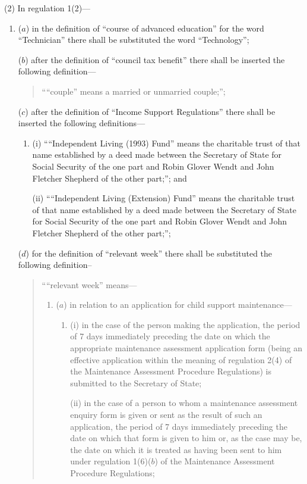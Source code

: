 \documentclass[a4paper]{article}
\begin{document}
(2) In regulation 1(2)---
\begin{enumerate}\item[]
($a$) in the definition of “course of advanced education” for the word “Technician” there shall be substituted the word “Technology”;

($b$) after the definition of “council tax benefit” there shall be inserted the following definition---
\begin{quotation}
““couple” means a married or unmarried couple;”;
\end{quotation}

($c$) after the definition of “Income Support Regulations” there shall be inserted the following definitions---
\begin{enumerate}\item[]
(i) ““Independent Living (1993) Fund” means the charitable trust of that name established by a deed made between the Secretary of State for Social Security of the one part and Robin Glover Wendt and John Fletcher Shepherd of the other part;”; and

(ii) ““Independent Living (Extension) Fund” means the charitable trust of that name established by a deed made between the Secretary of State for Social Security of the one part and Robin Glover Wendt and John Fletcher Shepherd of the other part;”;
\end{enumerate}

($d$) for the definition of “relevant week” there shall be substituted the following definition–
\begin{quotation}
““relevant week” means---
\begin{enumerate}\item[]
($a$) in relation to an application for child support maintenance\hspace{0pt}---
\begin{enumerate}\item[]
(i) in the case of the person making the application, the period of 7 days immediately preceding the date on which the appropriate maintenance assessment application form (being an effective application within the meaning of regulation 2(4) of the Maintenance Assessment Procedure Regulations) is submitted to the Secretary of State;

(ii) in the case of a person to whom a maintenance assessment enquiry form is given or sent as the result of such an application, the period of 7 days immediately preceding the date on which that form is given to him or, as the case may be, the date on which it is treated as having been sent to him under regulation 1(6)($b$) of the Maintenance Assessment Procedure Regulations;
\end{enumerate}


\end{enumerate}
\end{quotation}
\end{enumerate}
\end{document}
